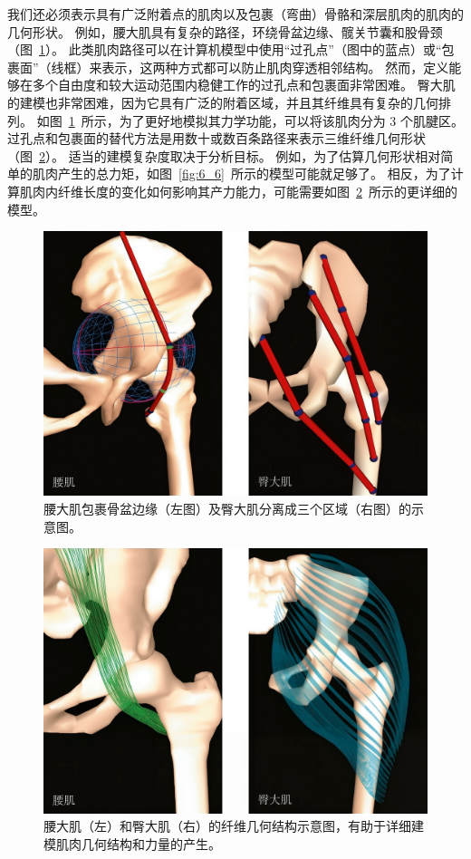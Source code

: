 我们还必须表示具有广泛附着点的肌肉以及包裹（弯曲）骨骼和深层肌肉的肌肉的几何形状。
例如，腰大肌具有复杂的路径，环绕骨盆边缘、髋关节囊和股骨颈（图~\ref{fig:6_15}）。
此类肌肉路径可以在计算机模型中使用“过孔点”（图中的蓝点）或“包裹面”（线框）来表示，这两种方式都可以防止肌肉穿透相邻结构。
然而，定义能够在多个自由度和较大运动范围内稳健工作的过孔点和包裹面非常困难。
臀大肌的建模也非常困难，因为它具有广泛的附着区域，并且其纤维具有复杂的几何排列。
如图~\ref{fig:6_15}~所示，为了更好地模拟其力学功能，可以将该肌肉分为 3 个肌腱区。
过孔点和包裹面的替代方法是用数十或数百条路径来表示三维纤维几何形状（图~\ref{fig:6_16}）。
适当的建模复杂度取决于分析目标。
例如，为了估算几何形状相对简单的肌肉产生的总力矩，如图~\ref{fig:6_6}~所示的模型可能就足够了。
相反，为了计算肌肉内纤维长度的变化如何影响其产力能力，可能需要如图~\ref{fig:6_16}~所示的更详细的模型。


\begin{figure}[!htb]
	\centering
	\includegraphics[width=0.7\linewidth]{chap6/6_15}
	\caption{腰大肌包裹骨盆边缘（左图）及臀大肌分离成三个区域（右图）的示意图\cite{blemker2005three}。 \label{fig:6_15}}
\end{figure}


\begin{figure}[!htb]
	\centering
	\includegraphics[width=0.7\linewidth]{chap6/6_16}
	\caption{腰大肌（左）和臀大肌（右）的纤维几何结构示意图，有助于详细建模肌肉几何结构和力量的产生\cite{blemker2005three}。 \label{fig:6_16}}
\end{figure}


